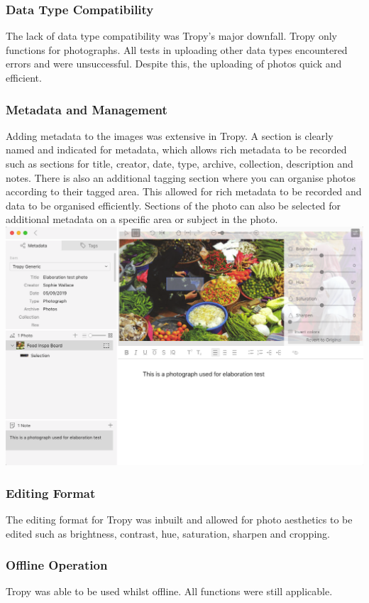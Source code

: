 \documentclass{article}
\begin{document}
\subsubsection{Data Type Compatibility}
The lack of data type compatibility was Tropy's major downfall. Tropy only functions for photographs. All tests in uploading other data types encountered errors and were unsuccessful. Despite this, the uploading of photos quick and efficient. 
\subsubsection{Metadata and Management}
Adding metadata to the images was extensive in Tropy. A section is clearly named and indicated for metadata, which allows rich metadata to be recorded such as sections for title, creator, date, type, archive, collection, description and notes. There is also an additional tagging section where you can organise photos according to their tagged area. This allowed for rich metadata to be recorded and data to be organised efficiently. Sections of the photo can also be selected for additional metadata on a specific area or subject in the photo. 
\includegraphics[width=\textwidth]{TropyMetadata.png}
\subsubsection{Editing Format}
The editing format for Tropy was inbuilt and allowed for photo aesthetics to be edited such as brightness, contrast, hue, saturation, sharpen and cropping. 
\subsubsection{Offline Operation}
Tropy was able to be used whilst offline. All functions were still applicable.
\end{document}
